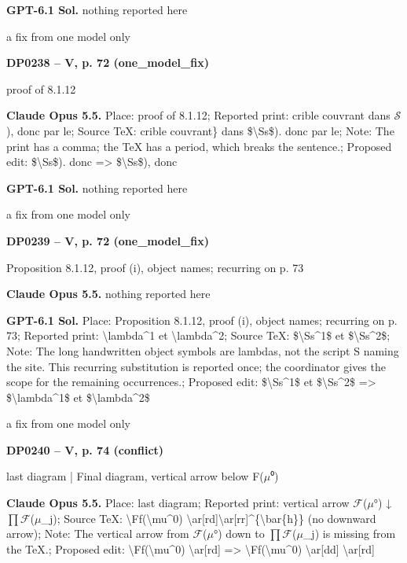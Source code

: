 \textbf{GPT-6.1 Sol.} nothing reported here\par
a fix from one model only\par
\par\noindent\hypertarget{DP0238}{}\textbf{DP0238 -- V, p. 72 (one\_model\_fix)}\par
proof of 8.1.12\par
\textbf{Claude Opus 5.5.} Place: proof of 8.1.12; Reported print: crible couvrant dans \ensuremath{𝒮}), donc par le; Source TeX: crible couvrant\} dans \$\textbackslash{}Ss\$). donc par le; Note: The print has a comma; the TeX has a period, which breaks the sentence.; Proposed edit: \$\textbackslash{}Ss\$). donc =\allowbreak > \$\textbackslash{}Ss\$), donc\par
\textbf{GPT-6.1 Sol.} nothing reported here\par
a fix from one model only\par
\par\noindent\hypertarget{DP0239}{}\textbf{DP0239 -- V, p. 72 (one\_model\_fix)}\par
Proposition 8.1.12, proof (i), object names; recurring on p. 73\par
\textbf{Claude Opus 5.5.} nothing reported here\par
\textbf{GPT-6.1 Sol.} Place: Proposition 8.1.12, proof (i), object names; recurring on p. 73; Reported print: \textbackslash{}lambda\textasciicircum{}1 et \textbackslash{}lambda\textasciicircum{}2; Source TeX: \$\textbackslash{}Ss\textasciicircum{}1\$ et   \$\textbackslash{}Ss\textasciicircum{}2\$; Note: The long handwritten object symbols are lambdas, not the script S naming the site. This recurring substitution is reported once; the coordinator gives the scope for the remaining occurrences.; Proposed edit: \$\textbackslash{}Ss\textasciicircum{}1\$ et   \$\textbackslash{}Ss\textasciicircum{}2\$ =\allowbreak > \$\textbackslash{}lambda\textasciicircum{}1\$ et   \$\textbackslash{}lambda\textasciicircum{}2\$\par
a fix from one model only\par
\par\noindent\hypertarget{DP0240}{}\textbf{DP0240 -- V, p. 74 (conflict)}\par
last diagram | Final diagram, vertical arrow below F(\ensuremath{\mu}⁰)\par
\textbf{Claude Opus 5.5.} Place: last diagram; Reported print: vertical arrow \ensuremath{\mathcal{F}}(\ensuremath{\mu}°) ↓ \ensuremath{\prod}\ensuremath{\mathcal{F}}(\ensuremath{\mu}\_j); Source TeX: \textbackslash{}Ff(\textbackslash{}mu\textasciicircum{}0) \textbackslash{}ar[rd]\textbackslash{}ar[rr]\textasciicircum{}\{\textbackslash{}bar\{h\}\} (no downward arrow); Note: The vertical arrow from \ensuremath{\mathcal{F}}(\ensuremath{\mu}°) down to \ensuremath{\prod}\ensuremath{\mathcal{F}}(\ensuremath{\mu}\_j) is missing from the TeX.; Proposed edit: \textbackslash{}Ff(\textbackslash{}mu\textasciicircum{}0) \textbackslash{}ar[rd] =\allowbreak > \textbackslash{}Ff(\textbackslash{}mu\textasciicircum{}0) \textbackslash{}ar[dd] \textbackslash{}ar[rd]\par
